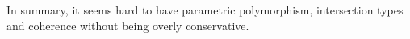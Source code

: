 In summary, it seems hard to have parametric polymorphism, intersection
types and coherence without being overly conservative.


\begin{comment}
\subsection{Intersection Types in Existing Languages}

What is an intersection type? The intersection of types $A$ and $B$
contains exactly those values which can be used as either of type $A$
or of type $B$.  Just as not all intersection of sets are nonempty,
not all intersections of types are inhabited.  For example, the
intersection of a base type $\tyint$ and a function type
$\tyint \to \tyint$ is not inhabited.\bruno{put this text somewhere?}

Since then various researchers have
studied intersection types, and some languages have adopted in one
form or another. However, while intersection types are already used
in various languages, the lack of a merge operator removes
considerable expressiveness.


A number of OO languages, such as
Java, C\#, Scala, and Ceylon\footnote{\url{http://ceylon-lang.org/}},
already support intersection types to different degrees. Intersection
types are particularly relevant for OOP as they can be used to model
multiple interface inheritance. In Java, for example,

\begin{lstlisting}
interface AwithB extends A, B {}
\end{lstlisting}

\noindent introduces a new interface \lstinline{AwithB} that satisfies the interfaces of
both \lstinline{A} and \lstinline{B}. Arguably such type can be considered as a nominal
intersection type. Scala takes one step further by eliminating the
need of a nominal type. For example, given two concrete traits, it is possible to
use \emph{mixin composition} to create an object that implements both
traits. Such an object has a (structural) intersection type:

\begin{lstlisting}
trait A
trait B

val newAB : A with B = new A with B
\end{lstlisting}

\noindent Scala also allows intersection of type parameters. For example:
\begin{lstlisting}
def merge[A,B] (x: A) (y: B) : A with B = ...
\end{lstlisting}
uses the annonymous intersection of two type parameters \lstinline{A} and
\lstinline{B}. However, in Scala it is not possible to dynamically
compose two objects. For example, the following code:


\end{comment}
